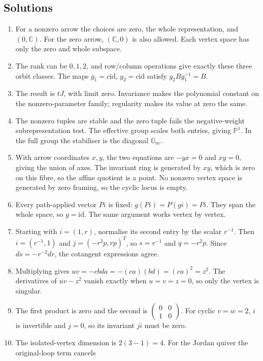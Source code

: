 \documentclass[11pt,a4paper]{article}
\numberwithin{equation}{section}
\theoremstyle{definition}
\newcommand{\PP}{\mathbb P}
\newcommand{\Gm}{\mathbb G_m}
\newcommand{\id}{\mathrm{id}}
\begin{document}
\subsection*{Solutions}
\begin{enumerate}[label=\textbf{\arabic*.},leftmargin=*]
\item For a nonzero arrow the choices are zero, the whole
representation, and $(0,\mathbb C)$. For the zero arrow,
$(\mathbb C,0)$ is also allowed. Each vertex space has
only the zero and whole subspace.
\item The rank can be $0,1,2$, and row/column operations
give exactly these three orbit classes. The maps
$g_1=c\id$, $g_2=c\id$ satisfy $g_2Bg_1^{-1}=B$.
\item The result is $tJ$, with limit zero. Invariance makes
the polynomial constant on the nonzero-parameter family;
regularity makes its value at zero the same.
\item The nonzero tuples are stable and the zero tuple fails
the negative-weight subrepresentation test. The effective
group scales both entries, giving $\PP^1$. In the full
group the stabiliser is the diagonal $\Gm$.
\item With arrow coordinates $x,y$, the two equations are
$-yx=0$ and $xy=0$, giving the union of axes.
The invariant ring is generated by $xy$, which is zero
on this fibre, so the affine quotient is a point.
No nonzero vertex space is generated by zero framing,
so the cyclic locus is empty.
\item Every path-applied vector $P i$ is fixed:
$g(Pi)=P(gi)=Pi$. They span the whole space, so $g=\id$.
The same argument works vertex by vertex.
\item Starting with $i=(1,r)$, normalise its second entry
by the scalar $r^{-1}$. Then $i=(r^{-1},1)$ and
$j=(-r^2p,rp)^T$, so $s=r^{-1}$ and $q=-r^2p$.
Since $ds=-r^{-2}dr$, the cotangent expressions agree.
\item Multiplying gives
$uv=-cbda=-(ca)(bd)=(ca)^2=z^2$.
The derivatives of $uv-z^2$ vanish exactly when
$u=v=z=0$, so only the vertex is singular.
\item The first product is zero and the second is
$\left(\begin{smallmatrix}0&0\\1&0\end{smallmatrix}\right)$.
For cyclic $v=w=2$, $i$ is invertible and $j=0$,
so its invariant $ji$ must be zero.
\item The isolated-vertex dimension is $2(3-1)=4$.
For the Jordan quiver the original-loop term cancels

\end{enumerate}
\end{document}
